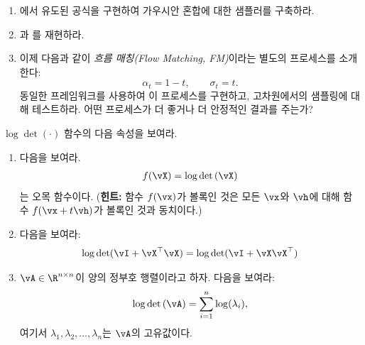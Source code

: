 \documentclass[../../book-main_ko.tex]{subfiles}
\begin{document}
\begin{exercise}\label{exercise:implement_denoising_processes}
\begin{enumerate}
    \item {}에서 유도된 공식을 구현하여 가우시안 혼합에 대한 샘플러를 구축하라.
    \item {}과 를 재현하라.
    \item 이제 다음과 같이 \textit{흐름 매칭(Flow Matching, FM)}이라는 별도의 프로세스를 소개한다:
    \begin{equation}
        \alpha_{t} = 1 - t, \qquad \sigma_{t} = t.
    \end{equation}
    동일한 프레임워크를 사용하여 이 프로세스를 구현하고, 고차원에서의 샘플링에 대해 테스트하라. 어떤 프로세스가 더 좋거나 더 안정적인 결과를 주는가?
\end{enumerate}
\end{exercise}


\begin{exercise}
	$\log\det(\cdot)$ 함수의 다음 속성을 보여라.
	\begin{enumerate}
		\item 다음을 보여라.
		      \begin{align*}
			      f(\vX) = \log\det\left(\vX\right)
		      \end{align*}
		      는 오목 함수이다. ({\bf 힌트:} 함수 $f(\vx)$가 볼록인 것은 모든 $\vx$와 $\vh$에 대해 함수 $f(\vx+t\vh)$가 볼록인 것과 동치이다.)

		\item 다음을 보여라:
		      \begin{align*}
			      \log\det(\vI + \vX^\top\vX) = \log\det(\vI + \vX\vX^\top)
		      \end{align*}

		\item $\vA \in \R^{n\times n}$이 양의 정부호 행렬이라고 하자. 다음을 보여라:
		      \begin{align}
			      \log\det\left(\vA \right) = \sum_{i=1}^n \log(\lambda_i),
		      \end{align}
		      여기서 $\lambda_1,\lambda_2,\dots,\lambda_n$는 $\vA$의 고유값이다.
	\end{enumerate}

\end{exercise}
\end{document}
